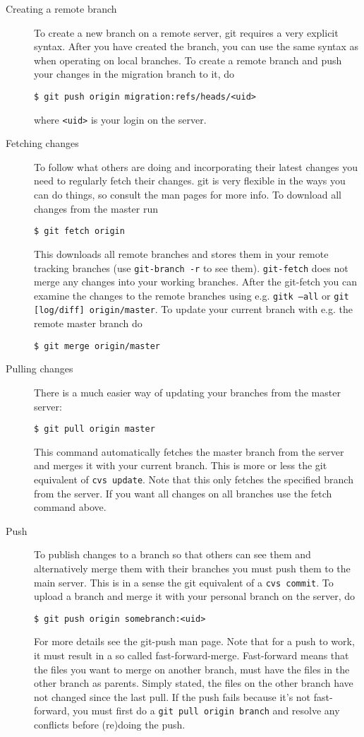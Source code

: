 \documentclass[a4paper,10pt]{article}
\begin{document}
\begin{description}
\item[Creating a remote branch] To create a new branch on a remote server, git
requires a very explicit syntax. After you have created the branch, you can
use the same syntax as when operating on local branches. To create a remote 
branch and push your changes in the migration branch to it, do
\begin{verbatim}
$ git push origin migration:refs/heads/<uid>
\end{verbatim}
where {\tt <uid>} is your login on the server.

\item[Fetching changes] To follow what others are doing and incorporating
their latest changes you need to regularly fetch their changes. git is very
flexible in the ways you can do things, so consult the man pages for more
info. To download all changes from the master run
\begin{verbatim}
$ git fetch origin 
\end{verbatim}
This downloads all remote branches and stores them in your remote tracking
branches (use {\tt git-branch -r} to see them). {\tt git-fetch} does not merge any changes
into your working branches. After the git-fetch you can examine the changes to
the remote branches using e.g. {\tt gitk --all} or 
{\tt git [log/diff] origin/master}.
To update your current branch with e.g. the remote master branch do
\begin{verbatim}
$ git merge origin/master
\end{verbatim}

\item[Pulling changes] There is a much easier way of updating your branches
from the master server:
\begin{verbatim}
$ git pull origin master
\end{verbatim}
This command automatically fetches the master branch from the server and
merges it with your current branch. This is more or less the git equivalent of
{\tt cvs update}. Note that this only fetches the specified branch from the
server. If you want all changes on all branches use the fetch command above.

\item[Push] To publish changes to a branch so that others can see them and
alternatively merge them with their branches you must push them to the main
server. This is in a sense the git equivalent of a {\tt cvs commit}. 
To upload a
branch and merge it with your personal branch on the server, do
\begin{verbatim}
$ git push origin somebranch:<uid>
\end{verbatim}
For more details see the git-push man page. Note that for a push to work, it
must result in a so called fast-forward-merge. Fast-forward means that the
files you want to merge on another branch, must have the files in the other
branch as parents. Simply stated, the files on the other branch have not
changed since the last pull.  If the push fails because it's not fast-forward,
you must first do a {\tt git pull origin branch} and resolve any conflicts 
before
(re)doing the push.


\end{description}
\end{document}
